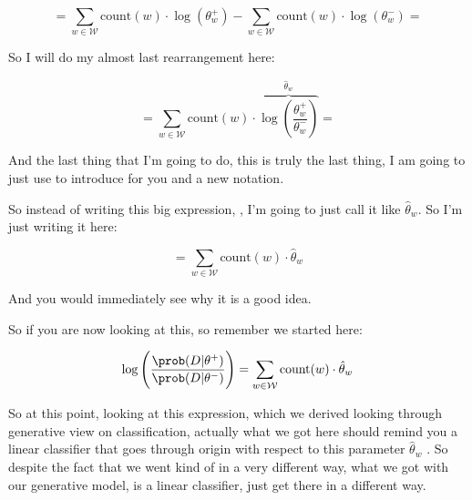 \documentclass[a4paper, 12pt]{article}
\begin{document}
\begin{equation}
= \sum_{w \in \mathcal{W}} \text{count}(w) \cdot \log(\theta_{w}^{+}) - \sum_{w \in \mathcal{W}} \text{count}(w) \cdot \log(\theta_{w}^{-}) =
\end{equation}

So I will do my almost last rearrangement here:

\begin{equation}
= \sum_{w \in \mathcal{W}} \text{count}(w) \cdot \overbrace{\log \left(\frac{\theta_{w}^{+}}{\theta_{w}^{-}}\right)}^{\hat{\theta}_{w}} =
\end{equation}

And the last thing that I'm going to do, this is truly the last thing, I am
going to just use to introduce for you and a new notation.

So instead of writing this big expression, , I'm going to just call it like
\(\hat{\theta}_w\). So I'm just writing it here:

\begin{equation}
= \sum_{w \in \mathcal{W}} \text{count}(w) \cdot \hat{\theta}_w
\end{equation}

And you would immediately see why it is a good idea.

So if you are now looking at this,  so remember we started here:

\begin{equation}
\log \left( \frac{\prob(D|\theta^{+})}{\prob(D|\theta^{-})} \right) = \sum_{w \in \mathcal{W}} \text{count}(w) \cdot \hat{\theta}_w
\end{equation}

So at this point, looking at this expression, which we derived looking through
generative view on classification, actually what we got here should remind you a
linear classifier that goes through origin with respect to this parameter
\(\hat{\theta}_w\) . So despite the fact that we went kind of in a very
different way, what we got with our generative model, is a linear
classifier, just get there in a different way.
\end{document}
